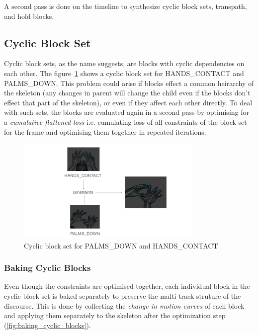 \documentclass[../../main.tex]{subfiles}
\begin{document}
A second pass is done on the timeline to synthesize cyclic block sets, transpath, and hold blocks.

\subsection{Cyclic Block Set}
\label{ch:multi_track:second_pass:cyclic_blocks}

Cyclic block sets, as the name suggests, are blocks with cyclic dependencies on each other. The figure~\ref{fig:cyclic_blocks} shows a cyclic block set for HANDS\_CONTACT and PALMS\_DOWN. This problem could arise if blocks effect a common heirarchy of the skeleton (any changes in parent will change the child even if the blocks don't effect that part of the skeleton), or even if they affect each other directly. To deal with such sets, the blocks are evaluated again in a second pass by optimising for a \emph{cumulative flattened loss} i.e. cumulating loss of all constraints of the block set for the frame and optimising them together in repeated iterations.

\begin{figure}[h]
    \centering
    \includegraphics[width=0.8\textwidth]{chapters/multi_track/images/cyclic_blocks.png}
    \caption{Cyclic block set for PALMS\_DOWN and HANDS\_CONTACT}
    \label{fig:cyclic_blocks}
\end{figure}

\subsubsection{Baking Cyclic Blocks}
\label{ch:multi_track:second_pass:cyclic_blocks:baking_cyclic_blocks}

Even though the constraints are optimised together, each individual block in the cyclic block set is baked separately to preserve the multi-track struture of the discourse. This is done by collecting the \emph{change in motion curves} of each block and applying them separately to the skeleton after the optimization step (\ref{fig:baking_cyclic_blocks}).
\end{document}
